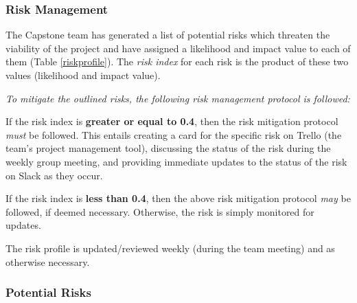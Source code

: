 \subsubsection{Risk Management}
The Capstone team has generated a list of potential risks which threaten the viability of the project and have assigned a likelihood and impact value to each of them (Table \ref{riskprofile}). The \textit{risk index} for each risk is the product of these two values (likelihood and impact value). 

\textit{To mitigate the outlined risks, the following risk management protocol is followed:}


If the risk index is \textbf{greater or equal to 0.4}, then the risk mitigation protocol \textit{must} be followed. This entails creating a card for the specific risk on Trello (the team's project management tool), discussing the status of the risk during the weekly group meeting, and providing immediate updates to the status of the risk on Slack as they occur.

If the risk index is \textbf{less than 0.4}, then the above risk mitigation protocol \textit{may} be followed, if deemed necessary. Otherwise, the risk is simply monitored for updates.

The risk profile is updated/reviewed weekly (during the team meeting) and as otherwise necessary. 


\subsubsection{Potential Risks}

